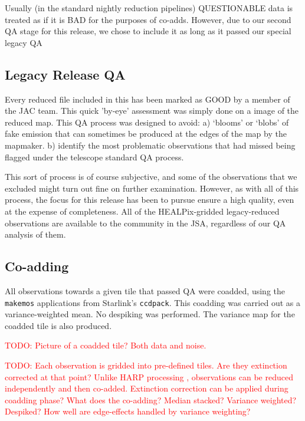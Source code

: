 \documentclass[usenatbib]{mn2e}
\newcommand{\todo}[1]{\textcolor{red}{TODO: #1}}
\begin{document}
Usually (in the standard nightly reduction pipelines) QUESTIONABLE
data is treated as if it is BAD for the purposes of co-adds. However,
due to our second QA stage for this release, we chose to include it as
long as it passed our special legacy QA

\subsection{Legacy Release QA}

Every reduced file included in this has been marked as GOOD by a
member of the JAC team. This quick 'by-eye' assessment was simply done
on a image of the reduced map. This QA process was designed to avoid:
a) `blooms' or `blobs' of fake emission that can sometimes be produced
at the edges of the map by the mapmaker.  b) identify the most
problematic observations that had missed being flagged under the
telescope standard QA process.

This sort of process is of course subjective, and some of the
observations that we excluded might turn out fine on further
examination. However, as with all of this process, the focus for this
release has been to pursue ensure a high quality, even at the expense
of completeness. All of the HEALPix-gridded legacy-reduced
observations are available to the community in the JSA, regardless of
our QA analysis of them.


\subsection{Co-adding}
All observations towards a given tile that passed QA were coadded,
using the \texttt{makemos} applications from Starlink's
\texttt{ccdpack}. This coadding was carried out as a variance-weighted
mean. No despiking was performed. The variance map for the coadded
tile is also produced.

\todo{Picture of a coadded tile? Both data and noise.}


\todo{Each observation is gridded into pre-defined tiles. Are they
  extinction corrected at that point? Unlike HARP processing
  \citep{2015ACSISDR}, observations can be reduced independently and
  then co-added. Extinction correction can be applied during coadding
  phase? What does the co-adding? Median stacked? Variance weighted?
  Despiked? How well are edge-effects handled by variance weighting?}
\end{document}
